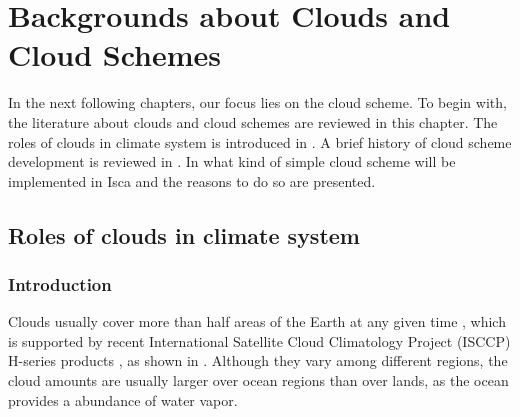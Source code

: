 
\chapter{Backgrounds about Clouds and Cloud Schemes}
\label{ch:chapter2}

In the next following chapters, our focus lies on the cloud scheme. To begin with, the literature about clouds and cloud schemes are reviewed in this chapter. The roles of clouds in climate system is introduced in . A brief history of cloud scheme development is reviewed in . In  what kind of simple cloud scheme will be implemented in Isca and the reasons to do so are presented.





\section{Roles of clouds in climate system}
\label{sec:chp2_role_of_clouds}

\subsection{Introduction}
Clouds usually cover more than half areas of the Earth at any given time \citep{Houze2014,Ramanathan1989}, which is supported by recent International Satellite Cloud Climatology Project (ISCCP) H-series products \citep{Young2018}, as shown in . Although they vary among different regions, the cloud amounts are usually larger over ocean regions than over lands, as the ocean provides a abundance of water vapor.

